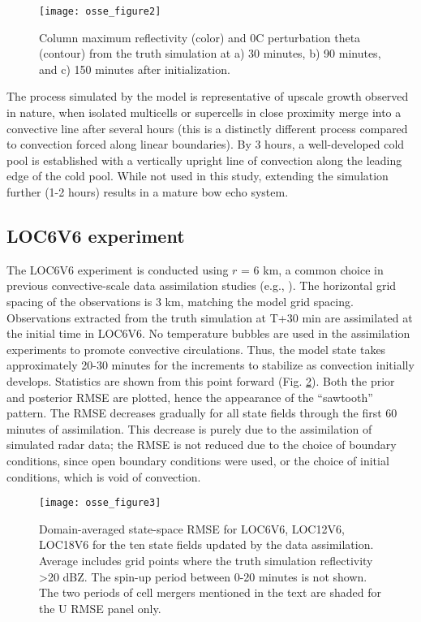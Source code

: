 \begin{figure}
\centering
\texttt{[image: osse\_figure2]}
\caption{Column maximum reflectivity (color) and 0C perturbation theta (contour) from the truth simulation at a) 30 minutes, b) 90 minutes, and c) 150 minutes after initialization.}
\label{osse_fig2}
\end{figure}

The process simulated by the model is representative of upscale growth observed in nature, when isolated multicells or supercells in close proximity merge into a convective line after several hours (this is a distinctly different process compared to convection forced along linear boundaries). By 3 hours, a well-developed cold pool is established with a vertically upright line of convection along the leading edge of the cold pool. While not used in this study, extending the simulation further (1-2 hours) results in a mature bow echo system.

\subsection{LOC6V6 experiment}
The LOC6V6 experiment is conducted using \(r\) = 6 km, a common choice in previous convective-scale data assimilation studies (e.g., \citealt{dowelletal04,dongetal11}). The horizontal grid spacing of the observations is 3 km, matching the model grid spacing. Observations extracted from the truth simulation at T+30 min are assimilated at the initial time in LOC6V6. No temperature bubbles are used in the assimilation experiments to promote convective circulations. Thus, the model state takes approximately 20-30 minutes for the increments to stabilize as convection initially develops. Statistics are shown from this point forward (Fig. \ref{osse_fig3}). Both the prior and posterior RMSE are plotted, hence the appearance of the “sawtooth” pattern. The RMSE decreases gradually for all state fields through the first 60 minutes of assimilation. This decrease is purely due to the assimilation of simulated radar data; the RMSE is not reduced due to the choice of boundary conditions, since open boundary conditions were used, or the choice of initial conditions, which is void of convection.

\begin{figure}
\centering
\texttt{[image: osse\_figure3]}
\caption{Domain-averaged state-space RMSE for LOC6V6, LOC12V6, LOC18V6 for the ten state fields updated by the data assimilation. Average includes grid points where the truth simulation reflectivity \textgreater 20 dBZ. The spin-up period between 0-20 minutes is not shown. The two periods of cell mergers mentioned in the text are shaded for the U RMSE panel only.}
\label{osse_fig3}
\end{figure}

